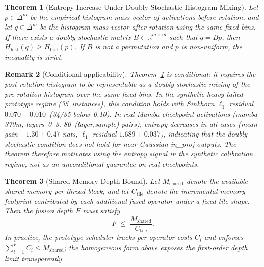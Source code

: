 \usepackage{amsthm}
\newtheorem{theorem}{Theorem}[section]
\newtheorem{remark}[theorem]{Remark}
\newtheorem{corollary}[theorem]{Corollary}


\begin{theorem}[Entropy Increase Under Doubly-Stochastic
Histogram Mixing]
\label{thm:entropy}
Let $p \in \Delta^m$ be the empirical histogram mass
vector of activations before rotation, and let
$q \in \Delta^m$ be the histogram mass vector after
rotation using the same fixed bins.
If there exists a doubly-stochastic matrix
$B \in \mathbb{R}^{m \times m}$ such that $q = Bp$,
then $H_{\mathrm{hist}}(q) \ge H_{\mathrm{hist}}(p)$.
If $B$ is not a permutation and $p$ is non-uniform,
the inequality is strict.
\end{theorem}

\begin{remark}[Conditional applicability]
\label{rem:conditional}
Theorem~\ref{thm:entropy} is conditional: it requires
the post-rotation histogram to be representable as a
doubly-stochastic mixing of the pre-rotation histogram
over the same fixed bins.
In the synthetic heavy-tailed prototype regime
(35~instances), this condition holds with Sinkhorn
$\ell_1$ residual $0.070 \pm 0.010$~(34/35 below~0.10).
In real Mamba checkpoint activations
(mamba-370m, layers~0--3, 80~(layer,sample) pairs),
entropy \emph{decreases} in all cases
(mean gain $-1.30 \pm 0.47$ nats,
$\ell_1$ residual $1.689 \pm 0.037$),
indicating that the doubly-stochastic condition does
not hold for near-Gaussian in\_proj outputs.
The theorem therefore motivates using the entropy
signal in the synthetic calibration regime, not as
an unconditional guarantee on real checkpoints.
\end{remark}


\begin{theorem}[Shared-Memory Depth Bound]
\label{thm:depth}
Let $M_{\mathrm{shared}}$ denote the available shared
memory per thread block, and let $C_{\mathrm{tile}}$
denote the incremental memory footprint contributed by
each additional fused operator under a fixed tile shape.
Then the fusion depth $F$ must satisfy
\[
  F \;\le\; \frac{M_{\mathrm{shared}}}{C_{\mathrm{tile}}}.
\]
In practice, the prototype scheduler tracks
per-operator costs $C_i$ and enforces
$\sum_{i=1}^{F} C_i \le M_{\mathrm{shared}}$;
the homogeneous form above exposes the first-order
depth limit transparently.
\end{theorem}

